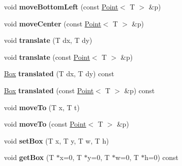 \begin{DoxyCompactItemize}
\item 
\hypertarget{class_box_a365ae8132302f9675d7d962fb7a8faec}{
void {\bfseries moveBottomLeft} (const \hyperlink{class_point}{Point}$<$ T $>$ \&p)}
\label{class_box_a365ae8132302f9675d7d962fb7a8faec}

\item 
\hypertarget{class_box_a62d7d531ad38076276749bcfc20285d2}{
void {\bfseries moveCenter} (const \hyperlink{class_point}{Point}$<$ T $>$ \&p)}
\label{class_box_a62d7d531ad38076276749bcfc20285d2}

\item 
\hypertarget{class_box_a2c3adee7df1462f3bfa5ae4870148505}{
void {\bfseries translate} (T dx, T dy)}
\label{class_box_a2c3adee7df1462f3bfa5ae4870148505}

\item 
\hypertarget{class_box_a077d6debae34fe86b701d7b2f8898c80}{
void {\bfseries translate} (const \hyperlink{class_point}{Point}$<$ T $>$ \&p)}
\label{class_box_a077d6debae34fe86b701d7b2f8898c80}

\item 
\hypertarget{class_box_a435e394b453a84f5c82f4163652dfb50}{
\hyperlink{class_box}{Box} {\bfseries translated} (T dx, T dy) const }
\label{class_box_a435e394b453a84f5c82f4163652dfb50}

\item 
\hypertarget{class_box_ac441f74500a5f381dd80639c683cfe7e}{
\hyperlink{class_box}{Box} {\bfseries translated} (const \hyperlink{class_point}{Point}$<$ T $>$ \&p) const }
\label{class_box_ac441f74500a5f381dd80639c683cfe7e}

\item 
\hypertarget{class_box_a484604d7fec04732de90ea55da3b7b6a}{
void {\bfseries moveTo} (T x, T t)}
\label{class_box_a484604d7fec04732de90ea55da3b7b6a}

\item 
\hypertarget{class_box_a3c7f973d21b9144b2b1d5a854f2aec9b}{
void {\bfseries moveTo} (const \hyperlink{class_point}{Point}$<$ T $>$ \&p)}
\label{class_box_a3c7f973d21b9144b2b1d5a854f2aec9b}

\item 
\hypertarget{class_box_a58b4172de656a853e63734c8501ca2d3}{
void {\bfseries setBox} (T x, T y, T w, T h)}
\label{class_box_a58b4172de656a853e63734c8501ca2d3}

\item 
\hypertarget{class_box_a2a5767d016fc9a5960f3e2a3c9fa5c89}{
void {\bfseries getBox} (T $\ast$x=0, T $\ast$y=0, T $\ast$w=0, T $\ast$h=0) const }
\label{class_box_a2a5767d016fc9a5960f3e2a3c9fa5c89}


\end{DoxyCompactItemize}
